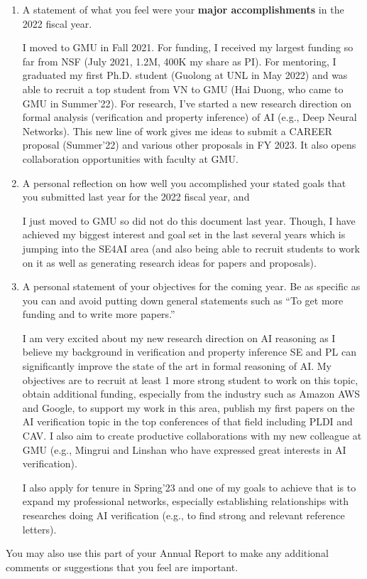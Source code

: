 \documentclass[11pt]{article}
\newcommand{\fy}{2022}
\begin{document}
\begin{enumerate}
\item
  A statement of what you feel were your \textbf{major accomplishments}
  in the \fy{} fiscal year.

  I moved to GMU in Fall 2021. For funding, I received my largest funding so far from NSF (July 2021, 1.2M, 400K my share as PI). For mentoring, I graduated my first Ph.D. student (Guolong at UNL in May 2022) and was able to recruit a top student from VN to GMU (Hai Duong, who came to GMU in Summer'22). For research, I've started a new research direction on formal analysis (verification and property inference) of AI (e.g., Deep Neural Networks). This new line of work gives me ideas to submit a CAREER proposal (Summer'22) and various other proposals in FY 2023. It also opens collaboration opportunities with faculty at GMU.
  
\item
  A personal reflection on how well you accomplished your stated goals
  that you submitted last year for the \fy{} fiscal year, and

  I just moved to GMU so did not do this document last year. Though, I have achieved my biggest interest and goal set in the last several years which is jumping into the SE4AI area (and also being able to recruit students to work on it as well as generating research ideas for papers and proposals).

\item
  A personal statement of your objectives for the coming year. Be as
  specific as you can and avoid putting down general statements such as
  ``To get more funding and to write more papers.''

  I am very excited about my new research direction on AI reasoning as I believe my background in verification and property inference SE and PL can significantly improve the state of the art in formal reasoning of AI.  My objectives are to recruit at least 1 more strong student to work on this topic, obtain additional funding, especially from the industry such as Amazon AWS and Google, to support my work in this area, publish my first papers on the AI verification topic in the top conferences of that field including PLDI and CAV. I also aim to create productive collaborations with my new colleague at GMU (e.g., Mingrui and Linshan who have expressed great interests in AI verification).

  I also apply for tenure in Spring'23 and one of my goals to achieve that is to expand my professional networks, especially establishing relationships with researches doing AI verification (e.g., to find strong and relevant reference letters).
  
\end{enumerate}

You may also use this part of your Annual Report to make any additional
comments or suggestions that you feel are important.
\end{document}

